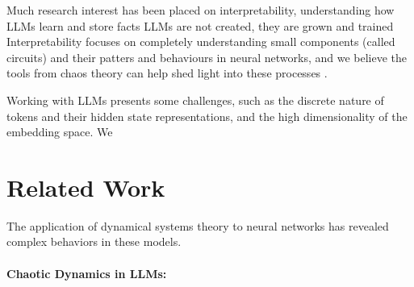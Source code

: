 \documentclass[a4paper,12pt]{article}
\begin{document}
Much research interest has been placed on interpretability, understanding how LLMs learn and store facts
LLMs are not created, they are grown and trained
Interpretability focuses on completely understanding small components (called circuits) and their patters and behaviours in neural networks, and we believe the tools from chaos theory can help shed light into these processes \cite{olah2020zoom} \cite{ameisen2025circuit} \cite{lindsey2025biology}.

Working with LLMs presents some challenges, such as the discrete nature of tokens and their hidden state representations, and the high dimensionality of the embedding space. We 

\section{Related Work} 
\label{sec:related_work}

The application of dynamical systems theory to neural networks has revealed complex behaviors in these models. 

\paragraph{Chaotic Dynamics in LLMs:}
\end{document}
